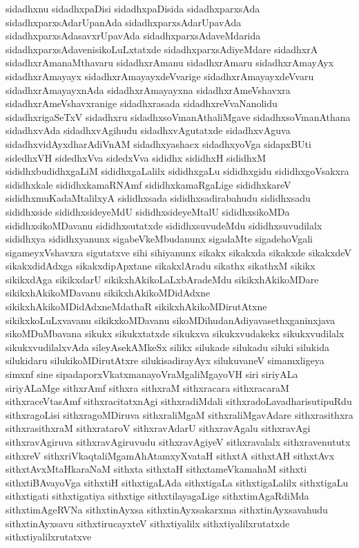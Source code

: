 {sidadhxnu
sidadhxpaDisi
sidadhxpaDisida
sidadhxparxsAda
sidadhxparxsAdarUpanAda
sidadhxparxsAdarUpavAda
sidadhxparxsAdasavxrUpavAda
sidadhxparxsAdaveMdarida
sidadhxparxsAdavenisikoLuLxtatxde
sidadhxparxsAdiyeMdare
sidadhxrA
sidadhxrAmanaMthavaru
sidadhxrAmanu
sidadhxrAmaru
sidadhxrAmayAyx
sidadhxrAmayayx
sidadhxrAmayayxdeVvarige
sidadhxrAmayayxdeVvaru
sidadhxrAmayayxnAda
sidadhxrAmayayxna
sidadhxrAmeVshavxra
sidadhxrAmeVshavxranige
sidadhxrasada
sidadhxreVvaNanolidu
sidadhxrigaSeTxV
sidadhxru
sidadhxsoVmanAthaliMgave
sidadhxsoVmanAthana
sidadhxvAda
sidadhxvAgihudu
sidadhxvAgutatxde
sidadhxvAguva
sidadhxvidAyxdharAdiVnAM
sidadhxyashacx
sidadhxyoVga
sidapxBUti
sidedhxVH
sidedhxVva
sidedxVva
sididhx
sididhxH
sididhxM
sididhxbudidhxgaLiM
sididhxgaLalilx
sididhxgaLu
sididhxgidu
sididhxgoVsakxra
sididhxkale
sididhxkamaRNAmf
sididhxkamaRgaLige
sididhxkareV
sididhxmuKadaMtalilxyA
sididhxsada
sididhxsadirabahudu
sididhxsadu
sididhxside
sididhxsideyeMdU
sididhxsideyeMtalU
sididhxsikoMDa
sididhxsikoMDavanu
sididhxsutatxde
sididhxsuvudeMdu
sididhxsuvudilalx
sididhxya
sididhxyanunx
sigabeVkeMbudanunx
sigadaMte
sigadehoVgali
sigameyxVshavxra
sigutatxve
sihi
sihiyanunx
sikakx
sikakxda
sikakxde
sikakxdeV
sikakxdidAdxga
sikakxdipApxtane
sikakxlAradu
sikathx
sikathxM
sikikx
sikikxdAga
sikikxdarU
sikikxhAkikoLaLxbAradeMdu
sikikxhAkikoMDare
sikikxhAkikoMDavanu
sikikxhAkikoMDidAdxne
sikikxhAkikoMDidAdxneMdathaR
sikikxhAkikoMDirutAtxne
sikikxkoLuLxvavanu
sikikxkoMDavanu
sikoMDihudanAdiyavasethxganinxjava
sikoMDuMbavana
sikukx
sikukxtatxde
sikukxva
sikukxvudakekx
sikukxvudilalx
sikukxvudilalxvAda
sileyAsekAMkeSx
silikx
silukade
silukadu
siluki
silukida
silukidaru
silukikoMDirutAtxre
silukisadirayAyx
silukuvaneV
simamxligeya
simxnf
sine
sipadaporxVkatxmanayoVraMgaliMgayoVH
siri
siriyALa
siriyALaMge
sithxrAmf
sithxra
sithxraM
sithxracara
sithxracaraM
sithxraceVtasAmf
sithxracitatxnAgi
sithxradiMdali
sithxradoLavadharisutipuRdu
sithxragoLisi
sithxragoMDiruva
sithxraliMgaM
sithxraliMgavAdare
sithxrasithxra
sithxrasithxraM
sithxrataroV
sithxravAdarU
sithxravAgalu
sithxravAgi
sithxravAgiruva
sithxravAgiruvudu
sithxravAgiyeV
sithxravalalx
sithxravenututx
sithxreV
sithxriVkaqtaliMgamAhAtamxyXvataH
sithxtA
sithxtAH
sithxtAvx
sithxtAvxMtaHkaraNaM
sithxta
sithxtaH
sithxtameVkamahaM
sithxti
sithxtiBAvayoVga
sithxtiH
sithxtigaLAda
sithxtigaLa
sithxtigaLalilx
sithxtigaLu
sithxtigati
sithxtigatiya
sithxtige
sithxtilayagaLige
sithxtimAgaRdiMda
sithxtimAgeRVNa
sithxtinAyxsa
sithxtinAyxsakarxma
sithxtinAyxsavahudu
sithxtinAyxsavu
sithxtirucayxteV
sithxtiyalilx
sithxtiyalilxrutatxde
sithxtiyalilxrutatxve
}
